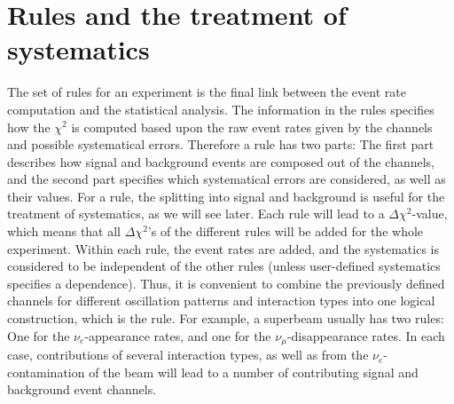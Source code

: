 \section{Rules and the treatment of systematics}
\label{sec:rules}

The set of rules for an experiment is the final 
link between the event rate computation and the statistical analysis. 
The information in the rules
specifies how the $\chi^2$ is computed based upon the raw event rates 
given by the channels and possible systematical errors. 
Therefore a rule has two parts: The first part describes how signal and 
background events are composed out of the channels, and the second part
specifies which systematical errors are considered, as well as their values.
%
For a rule, the splitting
into signal and background is useful for the treatment of systematics, as we will see later. Each rule will lead to a $\Delta \chi^2$-value,
which means that all $\Delta \chi^2$'s of the different rules will be added
for the whole experiment. Within each rule, the event rates are added, and
the systematics is considered to be independent of the other rules (unless user-defined
systematics specifies a dependence).
Thus, it is convenient to combine the previously defined channels for different
oscillation patterns and interaction types into one logical construction,
which is the rule. For example, a superbeam usually has two rules: One for
the $\nu_e$-appearance rates, and one for the $\nu_\mu$-disappearance rates.
 In each case, contributions of several interaction types, as well as from
 the $\nu_e$-contamination of the beam will lead to a number of contributing signal and background event channels.


